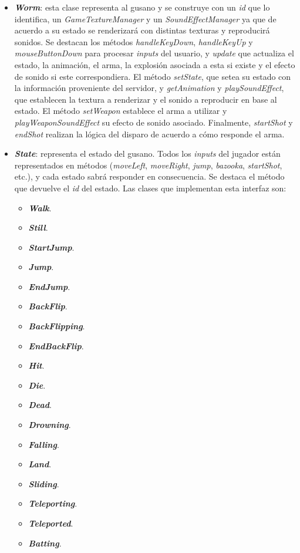 \begin{itemize}
	\item \textbf{\textit{Worm}}: esta clase representa al gusano y se construye con un \textit{id} que lo identifica, un \textit{GameTextureManager} y un \textit{SoundEffectManager} ya que de acuerdo a su estado se renderizará con distintas texturas y reproducirá sonidos. Se destacan los métodos \textit{handleKeyDown}, \textit{handleKeyUp} y \textit{mouseButtonDown} para procesar \textit{inputs} del usuario, y \textit{update} que actualiza el estado, la animación, el arma, la explosión asociada a esta si existe y el efecto de sonido si este correspondiera. El método \textit{setState}, que setea su estado con la información proveniente del servidor, y \textit{getAnimation} y \textit{playSoundEffect}, que establecen la textura a renderizar y el sonido a reproducir en base al estado. El método \textit{setWeapon} establece el arma a utilizar y \textit{playWeaponSoundEffect} su efecto de sonido asociado. Finalmente, \textit{startShot} y \textit{endShot} realizan la lógica del disparo de acuerdo a cómo responde el arma.

	\item \textbf{\textit{State}}: representa el estado del gusano. Todos los \textit{inputs} del jugador están representados en métodos (\textit{moveLeft}, \textit{moveRight}, \textit{jump}, \textit{bazooka}, \textit{startShot}, etc.), y cada estado sabrá responder en consecuencia. Se destaca el método que devuelve el \textit{id} del estado. Las clases que implementan esta interfaz son:
	\begin{itemize}
		\item \textbf{\textit{Walk}}.
		\item \textbf{\textit{Still}}.
		\item \textbf{\textit{StartJump}}.
		\item \textbf{\textit{Jump}}.
		\item \textbf{\textit{EndJump}}.
		\item \textbf{\textit{BackFlip}}.
		\item \textbf{\textit{BackFlipping}}.
		\item \textbf{\textit{EndBackFlip}}.
		\item \textbf{\textit{Hit}}.
		\item \textbf{\textit{Die}}.
		\item \textbf{\textit{Dead}}.
		\item \textbf{\textit{Drowning}}.
		\item \textbf{\textit{Falling}}.
		\item \textbf{\textit{Land}}.
		\item \textbf{\textit{Sliding}}.
		\item \textbf{\textit{Teleporting}}.
		\item \textbf{\textit{Teleported}}.
		\item \textbf{\textit{Batting}}.
	\end{itemize}


\end{itemize}
